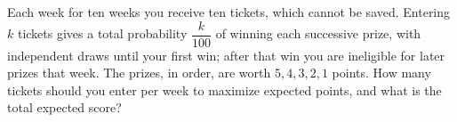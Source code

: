 Each week for ten weeks you receive ten tickets, which cannot be saved. Entering $k$ tickets gives a total probability $\dfrac{k}{100}$ of winning each successive prize, with independent draws until your first win; after that win you are ineligible for later prizes that week. The prizes, in order, are worth $5,4,3,2,1$ points. How many tickets should you enter per week to maximize expected points, and what is the total expected score?
